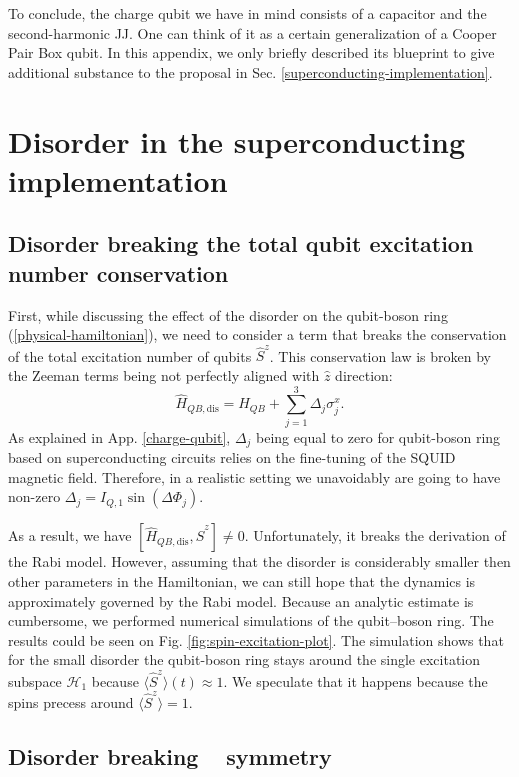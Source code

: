 \documentclass[reprint, aps, prx, amsmath, amssymb, longbibliography, superscriptaddress]{revtex4-2}
\DeclareMathOperator{\Zthree}{\mathbb{Z}_3}
\begin{document}
To conclude, the charge qubit we have in mind consists of a capacitor and the second-harmonic JJ. One can think of it as a certain generalization of a Cooper Pair Box qubit. In this appendix, we only briefly described its blueprint to give additional substance to the proposal in Sec. \ref{superconducting-implementation}.


\section{Disorder in the superconducting implementation}
\subsection{Disorder breaking the total qubit excitation number conservation}


First, while discussing the effect of the disorder on the qubit-boson ring (\ref{physical-hamiltonian}), we need to consider a term that breaks the conservation of the total excitation number of qubits $\hat S^z$. This conservation law is broken by the Zeeman terms being not perfectly aligned with $\hat z$ direction:
\begin{equation}
    \hat H_{QB,\text{dis}} = \hat H_{QB} + \sum_{j=1}^3 \Delta_j \sigma_j^x.
\end{equation}
As explained in App. \ref{charge-qubit}, $\Delta_j$ being equal to zero for qubit-boson ring based on superconducting circuits relies on the fine-tuning of the SQUID magnetic field. Therefore, in a realistic setting we unavoidably are going to have non-zero $\Delta_j = I_{Q,1}\sin(\Delta \Phi_j)$.

As a result, we have $[\hat H_{QB,\text{dis}}, \hat S^z] \neq 0 $. Unfortunately, it breaks the derivation of the Rabi model. However, assuming that the disorder is considerably smaller then other parameters in the Hamiltonian, we can still hope that the dynamics is approximately governed by the Rabi model. Because an analytic estimate is cumbersome, we performed numerical simulations of the qubit–boson ring. The results could be seen on Fig. \ref{fig:spin-excitation-plot}. The simulation shows that for the small disorder the qubit-boson ring stays around the single excitation subspace $\mathcal{H}_1$ because $\langle \hat S^z \rangle(t) \approx 1$. We speculate that it happens because the spins precess around $\langle \hat S^z \rangle = 1$.


\subsection{Disorder breaking \texorpdfstring{$\Zthree$}{Z3} symmetry}
\end{document}
